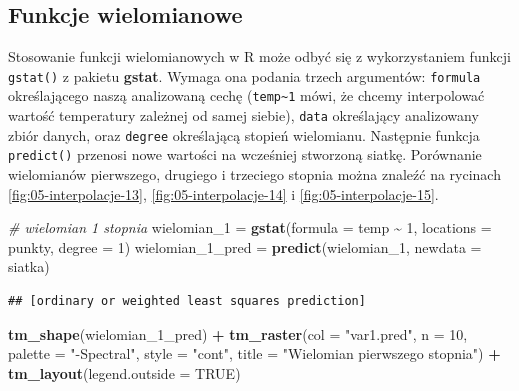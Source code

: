 \documentclass[
  paper=6in:9in,pagesize=pdftex,headinclude=on,footinclude=on,10pt]{scrbook}
\newenvironment{Shaded}{\begin{snugshade}}{\end{snugshade}}
\newcommand{\AttributeTok}[1]{\textcolor[rgb]{0.13,0.29,0.53}{#1}}
\newcommand{\CommentTok}[1]{\textcolor[rgb]{0.56,0.35,0.01}{\textit{#1}}}
\newcommand{\ConstantTok}[1]{\textcolor[rgb]{0.56,0.35,0.01}{#1}}
\newcommand{\DecValTok}[1]{\textcolor[rgb]{0.00,0.00,0.81}{#1}}
\newcommand{\FunctionTok}[1]{\textcolor[rgb]{0.13,0.29,0.53}{\textbf{#1}}}
\newcommand{\NormalTok}[1]{#1}
\newcommand{\OtherTok}[1]{\textcolor[rgb]{0.56,0.35,0.01}{#1}}
\newcommand{\SpecialCharTok}[1]{\textcolor[rgb]{0.81,0.36,0.00}{\textbf{#1}}}
\newcommand{\StringTok}[1]{\textcolor[rgb]{0.31,0.60,0.02}{#1}}
\begin{document}
\subsection{Funkcje wielomianowe}\label{funkcje-wielomianowe}

Stosowanie funkcji wielomianowych w R może odbyć się z wykorzystaniem funkcji \texttt{gstat()} z pakietu \textbf{gstat}.
Wymaga ona podania trzech argumentów: \texttt{formula} określającego naszą analizowaną cechę (\texttt{temp\textasciitilde{}1} mówi, że chcemy interpolować wartość temperatury zależnej od samej siebie), \texttt{data} określający analizowany zbiór danych, oraz \texttt{degree} określającą stopień wielomianu.
Następnie funkcja \texttt{predict()} przenosi nowe wartości na wcześniej stworzoną siatkę.
Porównanie wielomianów pierwszego, drugiego i trzeciego stopnia można znaleźć na rycinach \ref{fig:05-interpolacje-13}, \ref{fig:05-interpolacje-14} i \ref{fig:05-interpolacje-15}.

\begin{Shaded}
\begin{Highlighting}[]
\CommentTok{\# wielomian 1 stopnia}
\NormalTok{wielomian\_1 }\OtherTok{=} \FunctionTok{gstat}\NormalTok{(}\AttributeTok{formula =}\NormalTok{ temp }\SpecialCharTok{\textasciitilde{}} \DecValTok{1}\NormalTok{, }\AttributeTok{locations =}\NormalTok{ punkty,}
                    \AttributeTok{degree =} \DecValTok{1}\NormalTok{)}
\NormalTok{wielomian\_1\_pred }\OtherTok{=} \FunctionTok{predict}\NormalTok{(wielomian\_1, }\AttributeTok{newdata =}\NormalTok{ siatka)}
\end{Highlighting}
\end{Shaded}

\begin{verbatim}
## [ordinary or weighted least squares prediction]
\end{verbatim}

\begin{Shaded}
\begin{Highlighting}[]
\FunctionTok{tm\_shape}\NormalTok{(wielomian\_1\_pred) }\SpecialCharTok{+}
        \FunctionTok{tm\_raster}\NormalTok{(}\AttributeTok{col =} \StringTok{"var1.pred"}\NormalTok{, }\AttributeTok{n =} \DecValTok{10}\NormalTok{, }\AttributeTok{palette =} \StringTok{"{-}Spectral"}\NormalTok{,}
                  \AttributeTok{style =} \StringTok{"cont"}\NormalTok{, }\AttributeTok{title =} \StringTok{"Wielomian pierwszego stopnia"}\NormalTok{) }\SpecialCharTok{+}
        \FunctionTok{tm\_layout}\NormalTok{(}\AttributeTok{legend.outside =} \ConstantTok{TRUE}\NormalTok{)}
\end{Highlighting}
\end{Shaded}
\end{document}
